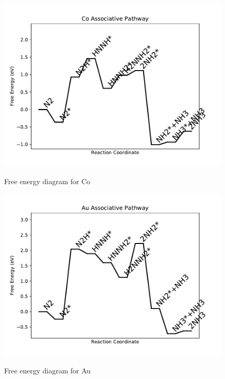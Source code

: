 \documentclass[journal=jacsat,manuscript=article]{achemso}
\begin{document}
\begin{figure}
\includegraphics[width=1\linewidth]{data/plots/Co_associative.pdf}
\label{fig:Co_associative}
\caption{Free energy diagram for Co}
\end{figure}

\newpage
\begin{figure}
\includegraphics[width=1\linewidth]{data/plots/Au_associative.pdf}
\label{fig:Au_associative}
\caption{Free energy diagram for Au}
\end{figure}
\end{document}
